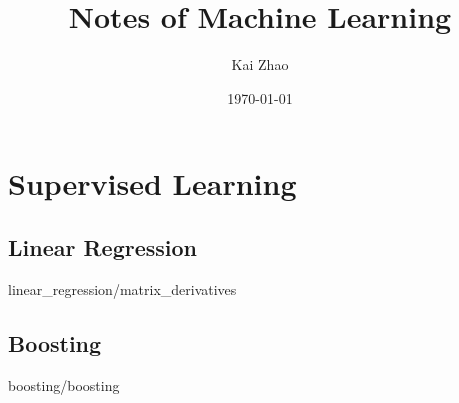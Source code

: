 \documentclass [11pt]{book}
\title {Notes of Machine Learning}
\author {Kai Zhao}
\date {\today}
\begin{document}
\maketitle

\tableofcontents


\part {Supervised Learning}

\chapter {Linear Regression}

 {linear_regression/matrix_derivatives}

\chapter {Boosting}

 {boosting/boosting}
\end{document}
